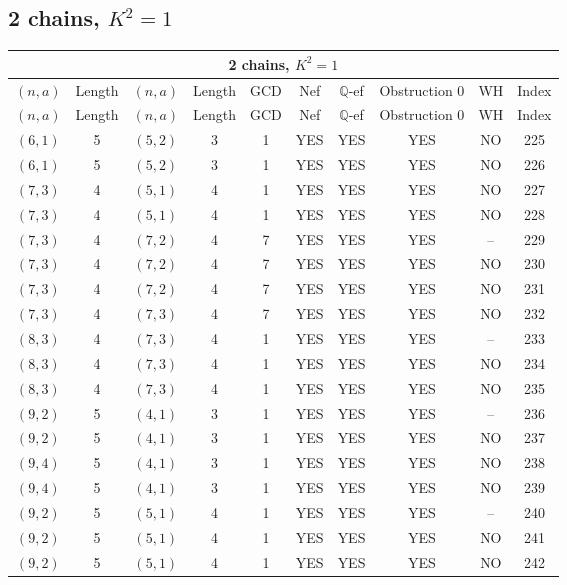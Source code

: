 \subsection{2 chains, $K^2 = 1$}
\begin{longtable}{|c|c|c|c|c|c|c|c|c|c|}
\hline
\multicolumn{10}{|c|}{2 chains, $K^2 = 1$}\\
\hline
$(n,a)$ & Length & $(n,a)$ & Length & GCD & Nef & $\mathbb Q$-ef & Obstruction 0 & WH & Index\\
\hline
\endfirsthead

\hline
$(n,a)$ & Length & $(n,a)$ & Length & GCD & Nef & $\mathbb Q$-ef & Obstruction 0 & WH & Index\\
\hline
\endhead
\hline
\endfoot

$(6, 1)$ & 5 & $(5, 2)$ & 3 & 1 & YES & YES & YES & NO & 225\\
$(6, 1)$ & 5 & $(5, 2)$ & 3 & 1 & YES & YES & YES & NO & 226\\
$(7, 3)$ & 4 & $(5, 1)$ & 4 & 1 & YES & YES & YES & NO & 227\\
$(7, 3)$ & 4 & $(5, 1)$ & 4 & 1 & YES & YES & YES & NO & 228\\
$(7, 3)$ & 4 & $(7, 2)$ & 4 & 7 & YES & YES & YES & -- & 229\\
$(7, 3)$ & 4 & $(7, 2)$ & 4 & 7 & YES & YES & YES & NO & 230\\
$(7, 3)$ & 4 & $(7, 2)$ & 4 & 7 & YES & YES & YES & NO & 231\\
$(7, 3)$ & 4 & $(7, 3)$ & 4 & 7 & YES & YES & YES & NO & 232\\
$(8, 3)$ & 4 & $(7, 3)$ & 4 & 1 & YES & YES & YES & -- & 233\\
$(8, 3)$ & 4 & $(7, 3)$ & 4 & 1 & YES & YES & YES & NO & 234\\
$(8, 3)$ & 4 & $(7, 3)$ & 4 & 1 & YES & YES & YES & NO & 235\\
$(9, 2)$ & 5 & $(4, 1)$ & 3 & 1 & YES & YES & YES & -- & 236\\
$(9, 2)$ & 5 & $(4, 1)$ & 3 & 1 & YES & YES & YES & NO & 237\\
$(9, 4)$ & 5 & $(4, 1)$ & 3 & 1 & YES & YES & YES & NO & 238\\
$(9, 4)$ & 5 & $(4, 1)$ & 3 & 1 & YES & YES & YES & NO & 239\\
$(9, 2)$ & 5 & $(5, 1)$ & 4 & 1 & YES & YES & YES & -- & 240\\
$(9, 2)$ & 5 & $(5, 1)$ & 4 & 1 & YES & YES & YES & NO & 241\\
$(9, 2)$ & 5 & $(5, 1)$ & 4 & 1 & YES & YES & YES & NO & 242\\

\end{longtable}
